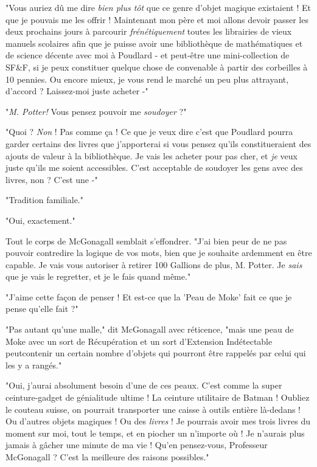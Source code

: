 "Vous auriez dû me dire \emph{bien plus tôt}  que ce genre d'objet magique existaient ! Et que je pouvais me les offrir ! Maintenant mon père et moi allons devoir passer les deux prochains jours à parcourir \emph{frénétiquement}  toutes les librairies de vieux manuels scolaires afin que je puisse avoir une bibliothèque de mathématiques et de science décente avec moi à Poudlard - et peut-être une mini-collection de SF\&F, si je peux constituer quelque chose de convenable à partir des corbeilles à 10 pennies. Ou encore mieux, je vous rend le marché un peu plus attrayant, d'accord ? Laissez-moi juste acheter -"

"\emph{M. Potter! } Vous pensez pouvoir me \emph{soudoyer}  ?"

"Quoi ? \emph{Non}  ! Pas comme ça ! Ce que je veux dire c'est que Poudlard pourra garder certains des livres que j'apporterai si vous pensez qu'ils constitueraient des ajouts de valeur à la bibliothèque. Je vais les acheter pour pas cher, et \emph{je}  veux juste qu'ils me soient accessibles. C'est acceptable de soudoyer les gens avec des livres, non ? C'est une -"

"Tradition familiale."

"Oui, exactement."

Tout le corps de McGonagall semblait s'effondrer. "J'ai bien peur de ne pas pouvoir contredire la logique de vos mots, bien que je souhaite ardemment en être capable. Je vais vous autoriser à retirer 100 Gallions de plus, M. Potter. Je \emph{sais } que je vais le regretter, et je le fais quand même."

"J'aime cette façon de penser ! Et est-ce que la 'Peau de Moke' fait ce que je pense qu'elle fait ?"

"Pas autant qu'une malle," dit McGonagall avec réticence, "mais une peau de Moke avec un sort de Récupération et un sort d'Extension Indétectable peutcontenir un certain nombre d'objets qui pourront être rappelés par celui qui les y a rangés."

"Oui, j'aurai absolument besoin d'une de ces peaux. C'est comme la super ceinture-gadget de génialitude ultime ! La ceinture utilitaire de Batman ! Oubliez le couteau suisse, on pourrait transporter une caisse à outils entière là-dedans ! Ou d'autres objets magiques ! Ou des \emph{livres}  ! Je pourrais avoir mes trois livres du moment sur moi, tout le temps, et en piocher un n'importe où ! Je n'aurais plus jamais à gâcher une minute de ma vie ! Qu'en pensez-vous, Professeur McGonagall ? C'est la meilleure des raisons possibles."

